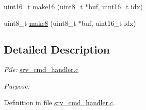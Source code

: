 {\bf }\par
\begin{DoxyCompactItemize}
\item 
uint16\-\_\-t \hyperlink{a00009_ga1e74920f34a07a82cca58eab71ed12b3}{make16} (uint8\-\_\-t $\ast$buf, uint16\-\_\-t idx)
\begin{DoxyCompactList}\small\item\em 

 \end{DoxyCompactList}\end{DoxyCompactItemize}

{\bf }\par
\begin{DoxyCompactItemize}
\item 
uint8\-\_\-t \hyperlink{a00009_gaefa26c3e5b22ccbe5de1c33305f20e1b}{make8} (uint8\-\_\-t $\ast$buf, uint16\-\_\-t idx)
\begin{DoxyCompactList}\small\item\em 

 \end{DoxyCompactList}\end{DoxyCompactItemize}



\subsection{Detailed Description}
{\itshape File\-:} \hyperlink{a00042}{srv\-\_\-cmd\-\_\-handler.\-c} \par
 {\itshape Purpose\-:} \par
 

Definition in file \hyperlink{a00042_source}{srv\-\_\-cmd\-\_\-handler.\-c}.

